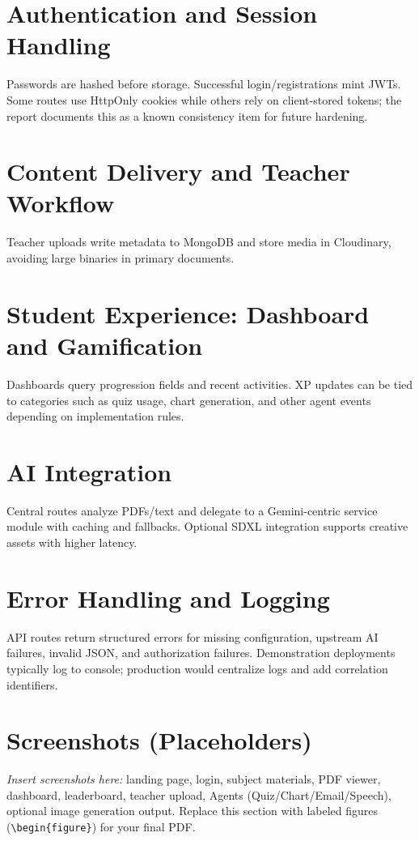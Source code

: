 \documentclass[a4paper,12pt,openany]{report}
\begin{document}
\section{Authentication and Session Handling}
Passwords are hashed before storage. Successful login/registrations mint JWTs. Some routes use HttpOnly cookies while others rely on client-stored tokens; the report documents this as a known consistency item for future hardening.

\section{Content Delivery and Teacher Workflow}
Teacher uploads write metadata to MongoDB and store media in Cloudinary, avoiding large binaries in primary documents.

\section{Student Experience: Dashboard and Gamification}
Dashboards query progression fields and recent activities. XP updates can be tied to categories such as quiz usage, chart generation, and other agent events depending on implementation rules.

\section{AI Integration}
Central routes analyze PDFs/text and delegate to a Gemini-centric service module with caching and fallbacks. Optional SDXL integration supports creative assets with higher latency.

\section{Error Handling and Logging}
API routes return structured errors for missing configuration, upstream AI failures, invalid JSON, and authorization failures. Demonstration deployments typically log to console; production would centralize logs and add correlation identifiers.

\section{Screenshots (Placeholders)}
\textit{Insert screenshots here:} landing page, login, subject materials, PDF viewer, dashboard, leaderboard, teacher upload, Agents (Quiz/Chart/Email/Speech), optional image generation output. Replace this section with labeled figures (\texttt{\textbackslash begin\{figure\}}) for your final PDF.
\end{document}
